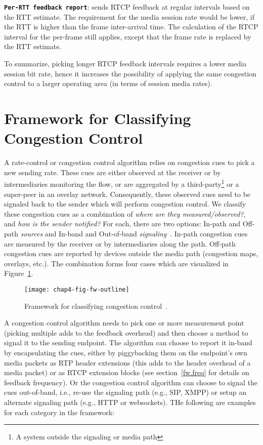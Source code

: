 \textbf{\texttt{Per-RTT feedback report}}: sends RTCP feedback at regular
intervals based on the RTT estimate. The requirement for the media session
rate would be lower, if the RTT is higher than the frame inter-arrival time.
The calculation of the RTCP interval for the per-frame still applies, except
that the frame rate is replaced by the RTT estimate.

To summarize, picking longer RTCP feedback intervals requires a lower media
session bit rate, hence it increases the possibility of applying the same
congestion control to a larger operating area (in terms of session media
rates).

\section{Framework for Classifying Congestion Control}
\label{fw.fw}

A rate-control or congestion control algorithm relies on congestion cues to
pick a new sending rate. These cues are either observed at the receiver or by
intermediaries monitoring the flow, or are aggregated by a
third-party\footnote{A system outside the signaling or media path} or a
super-peer in an overlay network. Consequently, these observed cues need to be
signaled back to the sender which will perform congestion control. We classify
these congestion cues as a combination of \emph{where are they
measured/observed?}, and \emph{how is the sender notified?} For each, there are
two options: In-path and Off-path \emph{sources} and In-band and Out-of-band 
\emph{signaling}~\cite{Singh:PhDFw}. In-path congestion cues are measured
by the receiver or by intermediaries along the path. Off-path congestion
cues are reported by devices outside the media path (congestion maps,
overlays, etc.). The combination forms four cases which are visualized in
Figure~\ref{fig:4:fw}.

\begin{figure}
\texttt{[image: chap4-fig-fw-outline]}
\caption{Framework for classifying congestion control~\cite{Singh:PhDFw}.}
\label{fig:4:fw}
\end{figure}

A congestion control algorithm needs to pick one or more measurement point
(picking multiple adds to the feedback overhead) and then choose a method
to signal it to the sending endpoint. The algorithm can choose to report it in-band by
encapsulating the cues, either by piggybacking them on the endpoint's own media
packets as RTP header extensions (this adds to the header overhead of a media
packet) or as RTCP extension blocks (see section~\ref{fw.freq} for details on
feedback frequency). Or the congestion control algorithm can choose to signal
the cues out-of-band, i.e., re-use the signaling path (e.g., SIP, XMPP) or
setup an alternate signaling path (e.g., HTTP or websockets). THe following are
examples for each category in the framework:


